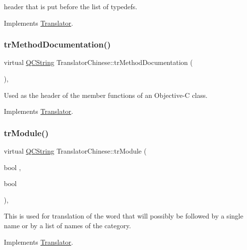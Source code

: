 header that is put before the list of typedefs. 

Implements \mbox{\hyperlink{class_translator}{Translator}}.

\mbox{\label{class_translator_chinese_ac3ee296ad407edff306f6a219941f865}} 
\subsubsection{\texorpdfstring{trMethodDocumentation()}{trMethodDocumentation()}}
{\footnotesize\ttfamily virtual \mbox{\hyperlink{class_q_c_string}{Q\+C\+String}} Translator\+Chinese\+::tr\+Method\+Documentation (\begin{DoxyParamCaption}{ }\end{DoxyParamCaption})\hspace{0.3cm}{\ttfamily [inline]}, {\ttfamily [virtual]}}

Used as the header of the member functions of an Objective-\/C class. 

Implements \mbox{\hyperlink{class_translator}{Translator}}.

\mbox{\label{class_translator_chinese_a07ee2974f4e86f9aab164b798e21d153}} 
\subsubsection{\texorpdfstring{trModule()}{trModule()}}
{\footnotesize\ttfamily virtual \mbox{\hyperlink{class_q_c_string}{Q\+C\+String}} Translator\+Chinese\+::tr\+Module (\begin{DoxyParamCaption}\item[{bool}]{,  }\item[{bool}]{ }\end{DoxyParamCaption})\hspace{0.3cm}{\ttfamily [inline]}, {\ttfamily [virtual]}}

This is used for translation of the word that will possibly be followed by a single name or by a list of names of the category. 

Implements \mbox{\hyperlink{class_translator}{Translator}}.

